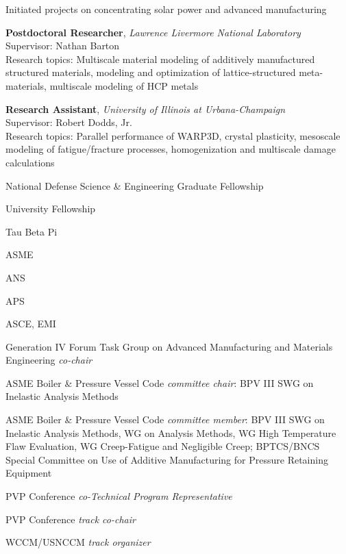 \documentclass[english]{xetexCV}
\begin{document}
Initiated projects on concentrating solar power and advanced manufacturing

\textbf{Postdoctoral Researcher}, \emph{Lawrence Livermore National
Laboratory} \\
Supervisor: Nathan Barton \\
Research topics: Multiscale material modeling of additively manufactured
structured materials, modeling and optimization of lattice-structured
meta-materials, multiscale modeling of HCP metals

\textbf{Research Assistant}, \emph{University of Illinois at Urbana-Champaign}
\\
Supervisor: Robert Dodds, Jr. \\
Research topics: Parallel performance of WARP3D, crystal plasticity,
mesoscale modeling of fatigue/fracture processes, homogenization and
multiscale damage calculations


National Defense Science \& Engineering Graduate Fellowship 

University Fellowship 

Tau Beta Pi 


ASME 

ANS 

APS 

ASCE, EMI 


 Generation IV Forum Task Group on Advanced Manufacturing and Materials Engineering \emph{co-chair} 

 ASME Boiler \& Pressure Vessel Code \emph{committee chair}: BPV III SWG on Inelastic Analysis Methods 

 ASME Boiler \& Pressure Vessel Code \emph{committee member}: BPV III SWG on Inelastic Analysis
Methods, WG on Analysis Methods, WG High Temperature Flaw Evaluation, 
WG Creep-Fatigue and Negligible Creep; BPTCS/BNCS Special Committee on 
Use of Additive Manufacturing for Pressure Retaining Equipment 

 PVP Conference \emph{co-Technical Program Representative} 

 PVP Conference \emph{track co-chair} 

 WCCM/USNCCM \emph{track organizer} 
\end{document}
